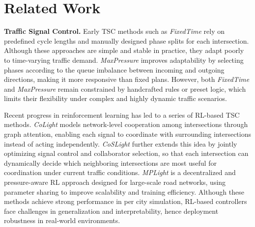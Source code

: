 \section{Related Work}
\textbf{Traffic Signal Control.} Early TSC methods such as \textit{FixedTime} \cite{webster} rely on predefined cycle lengths and manually designed phase splits for each intersection. Although these approaches are simple and stable in practice, they adapt poorly to time-varying traffic demand. \textit{MaxPressure} \cite{MERCADER2020275} improves adaptability by selecting phases according to the queue imbalance between incoming and outgoing directions, making it more responsive than fixed plans. However, both \textit{FixedTime} and \textit{MaxPressure} remain constrained by handcrafted rules or preset logic, which limits their flexibility under complex and highly dynamic traffic scenarios.

Recent progress in reinforcement learning has led to a series of RL-based TSC methods. \textit{CoLight} \cite{10.1145/3357384.3357902} models network-level cooperation among intersections through graph attention, enabling each signal to coordinate with surrounding intersections instead of acting independently. \textit{CoSLight} \cite{ruan2024coslightcooptimizingcollaboratorselection} further extends this idea by jointly optimizing signal control and collaborator selection, so that each intersection can dynamically decide which neighboring intersections are most useful for coordination under current traffic conditions. \textit{MPLight} \cite{Chen_Wei_Xu_Zheng_Yang_Xiong_Xu_Li_2020} is a decentralized and pressure-aware RL approach designed for large-scale road networks, using parameter sharing to improve scalability and training efficiency. Although these methods achieve strong performance in per city simulation, RL-based controllers face challenges in generalization and interpretability, hence deployment robustness in real-world environments.

